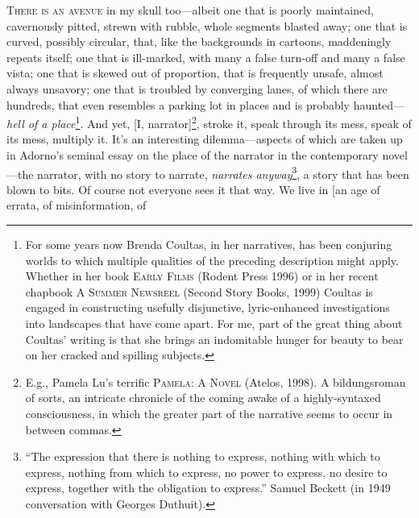 \documentclass[
]{memoir}
\begin{document}
\lettrine[lines=3, findent=0em, nindent=0.1em, lhang=0]{T}{here is an avenue}
in my skull too---albeit one that is poorly maintained, cavernously
pitted, strewn with rubble, whole segments blasted away; one that is
curved, possibly circular, that, like the backgrounds in cartoons,
maddeningly repeats itself; one that is ill-marked, with many a false
turn-off and many a false vista; one that is skewed out of proportion,
that is frequently unsafe, almost always unsavory; one that is troubled
by converging lanes, of which there are hundreds, that even resembles a
parking lot in places and is probably haunted---\emph{hell of a
place}\footnote{For some years now Brenda Coultas, in her narratives,
  has been conjuring worlds to which multiple qualities of the preceding
  description might apply. Whether in her book \textsc{Early Films}
  (Rodent Press 1996) or in her recent chapbook \textsc{A Summer
  Newsreel} (Second Story Books, 1999) Coultas is engaged in
  constructing usefully disjunctive, lyric-enhanced investigations into
  landscapes that have come apart. For me, part of the great thing about
  Coultas' writing is that she brings an indomitable hunger for beauty
  to bear on her cracked and spilling subjects.}. And yet, {[}I,
narrator{]}\footnote{E.g., Pamela Lu's terrific \textsc{Pamela: A Novel}
  (Atelos, 1998). A bildungsroman of sorts, an intricate chronicle of
  the coming awake of a highly-syntaxed consciousness, in which the
  greater part of the narrative seems to occur in between commas.},
stroke it, speak through its mess, speak of its mess, multiply it. It's
an interesting dilemma---aspects of which are taken up in Adorno's
seminal essay on the place of the narrator in the contemporary
novel---the narrator, with no story to narrate, \emph{narrates
anyway}\footnote{``The expression that there is nothing to express,
  nothing with which to express, nothing from which to express, no power
  to express, no desire to express, together with the obligation to
  express.'' Samuel Beckett (in 1949 conversation with Georges Duthuit).},
a story that has been blown to bits. Of course not everyone sees it that
way. We live in {[}an age of errata, of misinformation, of
\end{document}
